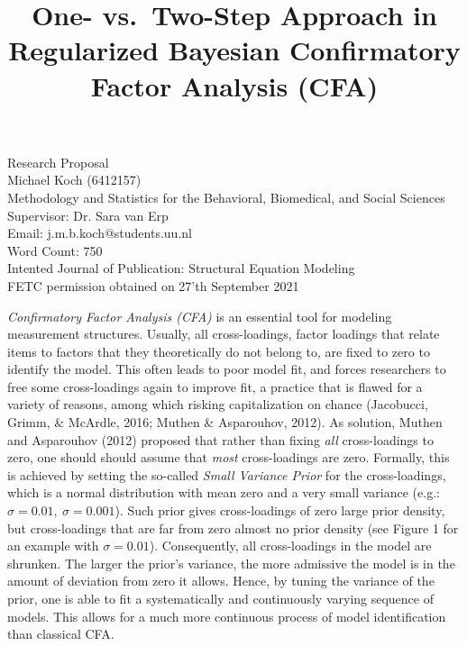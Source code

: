 \documentclass[
  english,
  man]{apa6}
\title{One- vs.~Two-Step Approach in Regularized Bayesian Confirmatory Factor Analysis (CFA)}
\author{\phantom{0}}
\date{}
\affiliation{\phantom{0}}
\begin{document}
\maketitle

\vfill
Research Proposal \\
Michael Koch (6412157)\\
Methodology and Statistics for the Behavioral, Biomedical, and Social Sciences \\
Supervisor: Dr. Sara van Erp \\ 
Email: j.m.b.koch@students.uu.nl \\
Word Count: 750 \\
Intented Journal of Publication: Structural Equation Modeling \\
FETC permission obtained on 27'th September 2021

\setcounter{page}{0}
\thispagestyle{empty}
\pagestyle{plain}

\clearpage

\emph{Confirmatory Factor Analysis (CFA)} is an essential tool for modeling
measurement structures. Usually, all cross-loadings, factor
loadings that relate items to factors that they theoretically do not belong to, are fixed to zero to identify the model. This often leads to poor model fit,
and forces researchers to free some cross-loadings again
to improve fit, a practice that is flawed for a variety of reasons,
among which risking capitalization on chance
(Jacobucci, Grimm, \& McArdle, 2016; Muthen \& Asparouhov, 2012). As solution,
Muthen and Asparouhov (2012) proposed that rather than fixing \emph{all}
cross-loadings to zero, one should should assume that \emph{most}
cross-loadings are zero. Formally, this is achieved by setting the
so-called \emph{Small Variance Prior} for the cross-loadings, which is a
normal distribution with mean zero and a very small variance (e.g.:
\(\sigma = 0.01, \  \sigma = 0.001\)). Such prior gives cross-loadings of
zero large prior density, but cross-loadings that are far from zero
almost no prior density (see Figure 1 for an example with
\(\sigma = 0.01\)). Consequently, all cross-loadings in the model are
shrunken. The larger the prior's variance, the more
admissive the model is in the amount of deviation from zero it allows.
Hence, by tuning the variance of the prior, one is able to fit a
systematically and continuously varying sequence of models. This allows
for a much more continuous process of model identification than classical CFA.
\end{document}
